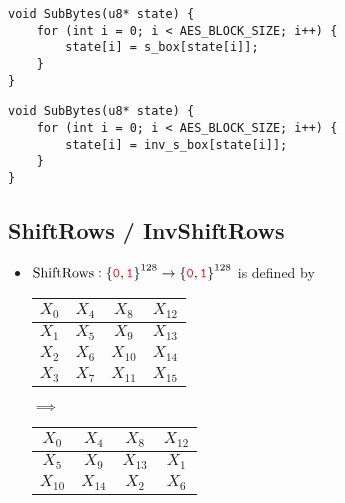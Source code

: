 \begin{lstlisting}[style=C, caption={Byte Substitution},captionpos=t]
void SubBytes(u8* state) {
	for (int i = 0; i < AES_BLOCK_SIZE; i++) {
		state[i] = s_box[state[i]];
	}
}
\end{lstlisting}

\begin{lstlisting}[style=C, caption={Inverse Byte Substitution},captionpos=t]
void SubBytes(u8* state) {
	for (int i = 0; i < AES_BLOCK_SIZE; i++) {
		state[i] = inv_s_box[state[i]];
	}
}
\end{lstlisting}

\newpage
\subsection{ShiftRows / InvShiftRows}
\begin{itemize}
	\item $\text{ShiftRows}:\set{\textcolor{red}{\texttt{0}},\textcolor{red}{\texttt{1}}}^{128}\to\set{\textcolor{red}{\texttt{0}},\textcolor{red}{\texttt{1}}}^{128}$ is defined by
	\begin{center}
	\begin{minipage}{.4\textwidth}\centering
		\begin{tabular}{|c|c|c|c|}
			\hline
			\cellcolor{red!20}$X_0$ & \cellcolor{red!20}$X_4$ & \cellcolor{red!20}$X_8$ & \cellcolor{red!20}$X_{12}$ \\ \hline
			\cellcolor{green!20}$X_1$ & \cellcolor{blue!20}$X_5$ & \cellcolor{blue!20}$X_9$ & \cellcolor{blue!20}$X_{13}$ \\ \hline
			\cellcolor{green!20}$X_2$ & \cellcolor{green!20}$X_6$ & \cellcolor{blue!20}$X_{10}$ & \cellcolor{blue!20}$X_{14}$ \\ \hline
			\cellcolor{green!20}$X_3$ & \cellcolor{green!20}$X_7$ & \cellcolor{green!20}$X_{11}$ & \cellcolor{blue!20}$X_{15}$ \\ \hline
		\end{tabular}
	\end{minipage}$\implies$\begin{minipage}{.4\textwidth}\centering
	\begin{tabular}{|c|c|c|c|}
		\hline
		\cellcolor{red!20}$X_0$ & \cellcolor{red!20}$X_4$ & \cellcolor{red!20}$X_8$ & \cellcolor{red!20}$X_{12}$ \\ \hline
		\cellcolor{blue!20}$X_5$ & \cellcolor{blue!20}$X_9$ & \cellcolor{blue!20}$X_{13}$ & \cellcolor{green!20}$X_1$ \\ \hline
		\cellcolor{blue!20}$X_{10}$ & \cellcolor{blue!20}$X_{14}$ & \cellcolor{green!20}$X_2$ & \cellcolor{green!20}$X_6$ \\ \hline

\end{tabular}
\end{minipage}
\end{center}
\end{itemize}
